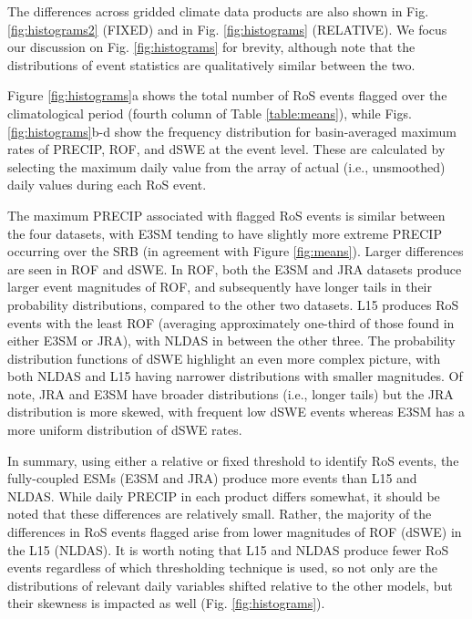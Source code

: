 \documentclass[nhess, manuscript]{copernicus}
\begin{document}
The differences across gridded climate data products are also shown in Fig. \ref{fig:histograms2} (FIXED) and in Fig. \ref{fig:histograms} (RELATIVE). We focus our discussion on Fig. \ref{fig:histograms} for brevity, although note that the distributions of event statistics are qualitatively similar between the two.

Figure \ref{fig:histograms}a shows the total number of RoS events flagged over the climatological period (fourth column of Table \ref{table:means}), while Figs. \ref{fig:histograms}b-d show the frequency distribution for basin-averaged maximum rates of PRECIP, ROF, and dSWE at the event level. These are calculated by selecting the maximum daily value from the array of actual (i.e., unsmoothed) daily values during each RoS event.

The maximum PRECIP associated with flagged RoS events is similar between the four datasets, with E3SM tending to have slightly more extreme PRECIP occurring over the SRB (in agreement with Figure \ref{fig:means}).
Larger differences are seen in ROF and dSWE.
In ROF, both the E3SM and JRA datasets produce larger event magnitudes of ROF, and subsequently have longer tails in their probability distributions, compared to the other two datasets.
L15 produces RoS events with the least ROF (averaging approximately one-third of those found in either E3SM or JRA), with NLDAS in between the other three.
The probability distribution functions of dSWE highlight an even more complex picture, with both NLDAS and L15 having narrower distributions with smaller magnitudes.
Of note, JRA and E3SM have broader distributions (i.e., longer tails) but the JRA distribution is more skewed, with frequent low dSWE events whereas E3SM has a more uniform distribution of dSWE rates.

In summary, using either a relative or fixed threshold to identify RoS events, the fully-coupled ESMs (E3SM and JRA) produce more events than L15 and NLDAS.
While daily PRECIP in each product differs somewhat, it should be noted that these differences are relatively small.
Rather, the majority of the differences in RoS events flagged arise from lower magnitudes of ROF (dSWE) in the L15 (NLDAS).
It is worth noting that L15 and NLDAS produce fewer RoS events regardless of which thresholding technique is used, so not only are the distributions of relevant daily variables shifted relative to the other models, but their skewness is impacted as well (Fig. \ref{fig:histograms}).
\end{document}
